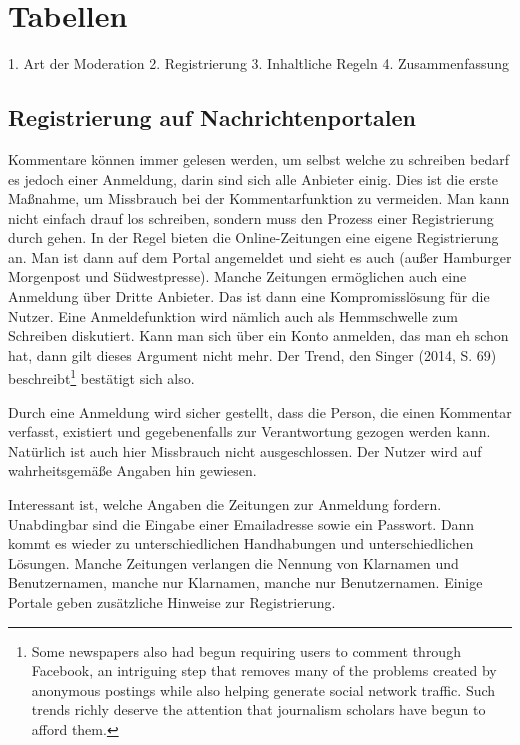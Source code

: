 \chapter{Tabellen}
1. Art der Moderation
2. Registrierung
3. Inhaltliche Regeln
4. Zusammenfassung


\section{Registrierung auf Nachrichtenportalen}

Kommentare können immer gelesen werden, um selbst welche zu schreiben bedarf es
jedoch einer Anmeldung, darin sind sich alle Anbieter einig. Dies ist die erste
Maßnahme, um Missbrauch bei der Kommentarfunktion zu vermeiden. Man kann nicht
einfach drauf los schreiben, sondern muss den Prozess einer Registrierung durch
gehen. In der Regel bieten die Online-Zeitungen eine eigene Registrierung an.
Man ist dann auf dem Portal angemeldet und sieht es auch (außer Hamburger
Morgenpost und Südwestpresse). Manche Zeitungen ermöglichen auch eine Anmeldung
über Dritte Anbieter. Das ist dann eine Kompromisslösung für die Nutzer. Eine
Anmeldefunktion wird nämlich auch als Hemmschwelle zum Schreiben diskutiert.
Kann man sich über ein Konto anmelden, das man eh schon hat, dann gilt dieses
Argument nicht mehr. Der Trend, den Singer (2014, S. 69)
beschreibt\footnote{\glqq Some newspapers also had begun requiring users to
comment through Facebook, an intriguing step that removes many of the problems
created by anonymous postings while also helping generate social network
traffic. Such trends richly deserve the attention that journalism scholars have
begun to afford them.\grqq} bestätigt sich also.

Durch eine Anmeldung wird sicher gestellt, dass die Person, die einen Kommentar
verfasst, existiert und gegebenenfalls zur Verantwortung gezogen werden kann.
Natürlich ist auch hier Missbrauch nicht ausgeschlossen. Der Nutzer wird auf
wahrheitsgemäße Angaben hin gewiesen. 

Interessant ist, welche Angaben die Zeitungen zur Anmeldung fordern. Unabdingbar
sind die Eingabe einer Emailadresse sowie ein Passwort. Dann kommt es wieder zu
unterschiedlichen Handhabungen und unterschiedlichen Lösungen. Manche Zeitungen
verlangen die Nennung von Klarnamen und Benutzernamen, manche nur Klarnamen,
manche nur Benutzernamen. Einige Portale geben zusätzliche Hinweise zur
Registrierung. 


